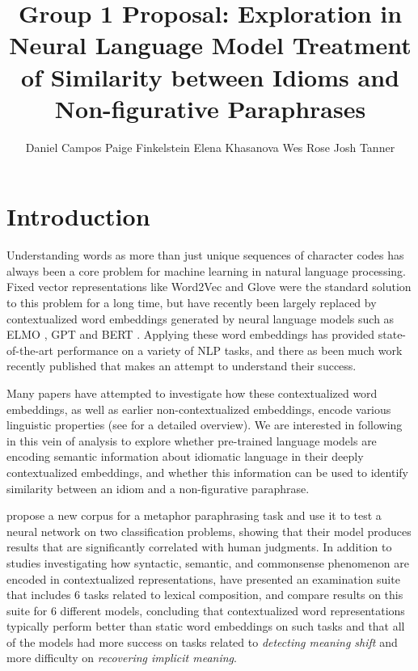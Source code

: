 \documentclass[11pt,a4paper]{article}
\title{Group 1 Proposal: Exploration in  Neural Language Model Treatment of Similarity between Idioms and Non-figurative Paraphrases}
\author{Daniel Campos \And
  Paige Finkelstein \And 
Elena Khasanova  \And
  Wes Rose  \And
  Josh Tanner   }
\begin{document}
\maketitle

\section{Introduction}
Understanding words as more than just unique sequences of character codes has always been a core problem for machine learning in natural language processing. Fixed vector representations like Word2Vec \cite{Mikolov2013DistributedRO} and Glove \cite{Pennington2014GloveGV} were the standard solution to this problem for a long time, but have recently been largely replaced by contextualized word embeddings generated by neural language models such as  ELMO \cite{Peters2018DeepCW}, GPT \cite{Radford2018ImprovingLU} and BERT \cite{Devlin2019BERTPO}. Applying these word embeddings has provided state-of-the-art performance on a variety of NLP tasks, and there as been much work recently published that makes an attempt to understand their success. 

Many papers have attempted to investigate how these contextualized word embeddings, as well as earlier non-contextualized embeddings, encode various linguistic properties (see \citet{Belinkov_2019} for a detailed overview). We are interested in following in this vein of analysis to explore whether pre-trained language models are encoding semantic information about idiomatic language in their deeply contextualized embeddings, and whether this information can be used to identify similarity between an idiom and a non-figurative paraphrase.

\citet{bizzoni-lappin-2018-predicting} propose a new corpus for a metaphor paraphrasing task and use it to test a neural network on two classification problems, showing that their model produces results that are significantly correlated with human judgments. In addition to studies investigating how syntactic, semantic, and commonsense \citep{zhou2019evaluating} phenomenon are encoded in contextualized representations, \citet{shwartz2019pain} have presented an examination suite that includes 6 tasks related to lexical composition, and compare results on this suite for 6 different models, concluding that contextualized word representations typically perform better than static word embeddings on such tasks and that all of the models had more success on tasks related to \textit{detecting meaning shift} and more difficulty on \textit{recovering implicit meaning}. 
\end{document}

